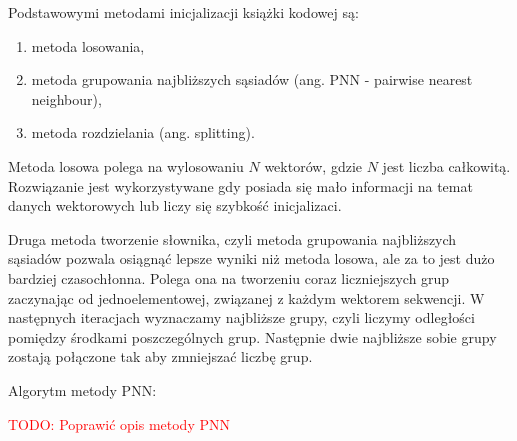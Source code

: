 \documentclass{article}
\newcommand{\todo}[1]{\textcolor{red}{TODO: #1}}
\begin{document}
Podstawowymi metodami inicjalizacji książki kodowej są:

\begin{enumerate}
  \item metoda losowania,
  \item metoda grupowania najbliższych sąsiadów (ang. PNN - pairwise nearest neighbour),
  \item metoda rozdzielania (ang. splitting).
\end{enumerate}

Metoda losowa polega na wylosowaniu $N$ wektorów, gdzie $N$ jest liczba całkowitą. 
Rozwiązanie jest wykorzystywane gdy posiada się mało informacji na temat danych wektorowych lub liczy się
szybkość inicjalizaci. 

Druga metoda tworzenie słownika, czyli metoda grupowania najbliższych sąsiadów pozwala osiągnąć lepsze wyniki niż metoda losowa, 
ale za to jest dużo bardziej czasochłonna. 
Polega ona na tworzeniu coraz liczniejszych grup zaczynając od jednoelementowej, związanej z każdym wektorem sekwencji. 
W następnych iteracjach wyznaczamy najbliższe grupy, czyli liczymy odległości pomiędzy środkami poszczególnych grup. 
Następnie dwie najbliższe sobie grupy zostają połączone tak aby zmniejszać liczbę grup.

Algorytm metody PNN:

\todo{Poprawić opis metody PNN}
\end{document}
